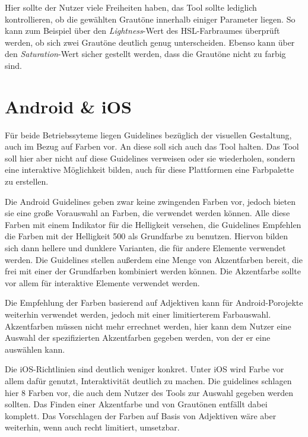 Hier sollte der Nutzer viele Freiheiten haben, das Tool sollte lediglich kontrollieren, ob die gewählten Grautöne innerhalb einiger Parameter liegen. So kann zum Beispiel über den \textit{Lightness}-Wert des HSL-Farbraumes überprüft werden, ob sich zwei Grautöne deutlich genug unterscheiden. Ebenso kann über den \textit{Saturation}-Wert sicher gestellt werden, dass die Grautöne nicht zu farbig sind.


\section{Android \& iOS}\label{androidios}

Für beide Betriebssyteme liegen Guidelines bezüglich der visuellen Gestaltung, auch im Bezug auf Farben vor. An diese soll sich auch das Tool halten. Das Tool soll hier aber nicht auf diese Guidelines verweisen oder sie wiederholen, sondern eine interaktive Möglichkeit bilden, auch für diese Plattformen eine Farbpalette zu erstellen.

Die Android Guidelines geben zwar keine zwingenden Farben vor, jedoch bieten sie eine große Vorauswahl an Farben, die verwendet werden können. Alle diese Farben mit einem Indikator für die Helligkeit versehen, die Guidelines Empfehlen die Farben mit der Helligkeit 500 als Grundfarbe zu benutzen. Hiervon bilden sich dann hellere und dunklere Varianten, die für andere Elemente verwendet werden.
Die Guidelines stellen außerdem eine Menge von Akzentfarben bereit, die frei mit einer der Grundfarben kombiniert werden können. Die Akzentfarbe sollte vor allem für interaktive Elemente verwendet werden.

Die Empfehlung der Farben basierend auf Adjektiven kann für Android-Porojekte weiterhin verwendet werden, jedoch mit einer limitierterem Farbauswahl. Akzentfarben müssen nicht mehr errechnet werden, hier kann dem Nutzer eine Auswahl der spezifizierten Akzentfarben gegeben werden, von der er eine auswählen kann.

Die iOS-Richtlinien sind deutlich weniger konkret. Unter iOS wird Farbe vor allem dafür genutzt, Interaktivität deutlich zu machen. Die guidelines schlagen hier 8 Farben vor, die auch dem Nutzer des Tools zur Auswahl gegeben werden sollten. Das Finden einer Akzentfarbe und von Grautönen entfällt dabei komplett. Das Vorschlagen der Farben auf Basis von Adjektiven wäre aber weiterhin, wenn auch recht limitiert, umsetzbar.


